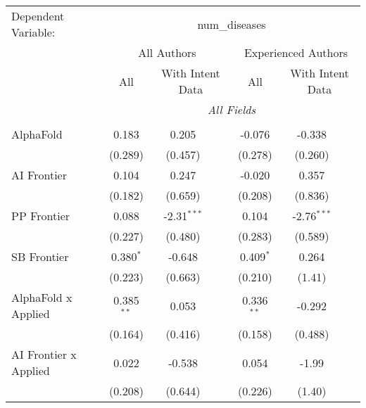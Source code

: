 \begingroup
\centering
\begin{tabular}{lcccccc}
   \tabularnewline \midrule \midrule
   Dependent Variable: & \multicolumn{6}{c}{num\_diseases}\\
 & \multicolumn{3}{c}{All Authors} & \multicolumn{3}{c}{Experienced Authors} \\
\cmidrule(lr){2-4} \cmidrule(lr){5-7}
 & \multicolumn{1}{c}{All} & \multicolumn{2}{c}{With Intent Data} & \multicolumn{1}{c}{All} & \multicolumn{2}{c}{With Intent Data} \\
\cmidrule(lr){2-2} \cmidrule(lr){3-4} \cmidrule(lr){5-5} \cmidrule(lr){6-7}
 & \multicolumn{6}{c}{\textit{All Fields}} \\ \\
   AlphaFold                      & 0.183         & 0.205         &              & -0.076        & -0.338        &   \\   
                                  & (0.289)       & (0.457)       &              & (0.278)       & (0.260)       &   \\   
   AI Frontier                    & 0.104         & 0.247         &              & -0.020        & 0.357         &   \\   
                                  & (0.182)       & (0.659)       &              & (0.208)       & (0.836)       &   \\   
   PP Frontier                    & 0.088         & -2.31$^{***}$ &              & 0.104         & -2.76$^{***}$ &   \\   
                                  & (0.227)       & (0.480)       &              & (0.283)       & (0.589)       &   \\   
   SB Frontier                    & 0.380$^{*}$   & -0.648        &              & 0.409$^{*}$   & 0.264         &   \\   
                                  & (0.223)       & (0.663)       &              & (0.210)       & (1.41)        &   \\   
   AlphaFold x Applied            & 0.385$^{**}$  & 0.053         &              & 0.336$^{**}$  & -0.292        &   \\   
                                  & (0.164)       & (0.416)       &              & (0.158)       & (0.488)       &   \\   
   AI Frontier x Applied          & 0.022         & -0.538        &              & 0.054         & -1.99         &   \\   
                                  & (0.208)       & (0.644)       &              & (0.226)       & (1.40)        &   \\   

\end{tabular}
